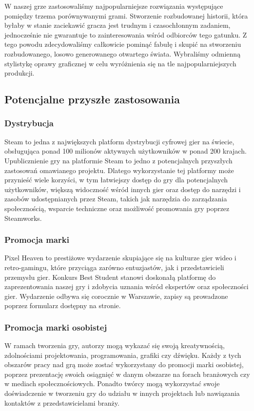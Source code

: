 \documentclass{article}
\begin{document}
W naszej grze zastosowaliśmy najpopularniejsze rozwiązania występujące pomiędzy trzema porównywanymi grami. Stworzenie rozbudowanej historii, która byłaby w stanie zaciekawić gracza jest trudnym i czasochłonnym zadaniem, jednocześnie nie gwarantuje to zainteresowania wśród odbiorców tego gatunku. Z tego powodu zdecydowaliśmy całkowicie pominąć fabułę i skupić na stworzeniu rozbudowanego, losowo generowanego otwartego świata. Wybraliśmy odmienną stylistykę oprawy graficznej w celu wyróżnienia się na tle najpopularniejszych produkcji.
\subsection{Potencjalne przyszłe zastosowania}
\subsubsection{Dystrybucja}
Steam to jedna z największych platform dystrybucji cyfrowej gier na świecie, obsługująca ponad 100 milionów aktywnych użytkowników w ponad 200 krajach. Upublicznienie gry na platformie Steam to jedno z potencjalnych przyszłych zastosowań omawianego projektu. Dlatego wykorzystanie tej platformy może przynieść wiele korzyści, w tym łatwiejszy dostęp do gry dla potencjalnych użytkowników, większą widoczność wśród innych gier oraz dostęp do narzędzi i zasobów udostępnianych przez Steam, takich jak narzędzia do zarządzania społecznością, wsparcie techniczne oraz możliwość promowania gry poprzez Steamworks.
\subsubsection{Promocja marki}
Pixel Heaven to prestiżowe wydarzenie skupiające się na kulturze gier wideo i retro-gamingu, które przyciąga zarówno entuzjastów, jak i przedstawicieli przemysłu gier. Konkurs Best Student stanowi doskonałą platformę do zaprezentowania naszej gry i zdobycia uznania wśród ekspertów oraz społeczności gier. Wydarzenie odbywa się corocznie w Warszawie, zapisy są prowadzone poprzez formularz dostępny na stronie.
\subsubsection{Promocja marki osobistej}
W ramach tworzenia gry, autorzy mogą wykazać się swoją kreatywnością, zdolnościami projektowania, programowania, grafiki czy dźwięku. Każdy z tych obszarów pracy nad grą może zostać wykorzystany do promocji marki osobistej, poprzez prezentację swoich osiągnięć w danym obszarze na forach branżowych czy w mediach społecznościowych. Ponadto twórcy mogą wykorzystać swoje doświadczenie w tworzeniu gry do udziału w innych projektach lub nawiązania kontaktów z przedstawicielami branży.
\end{document}
